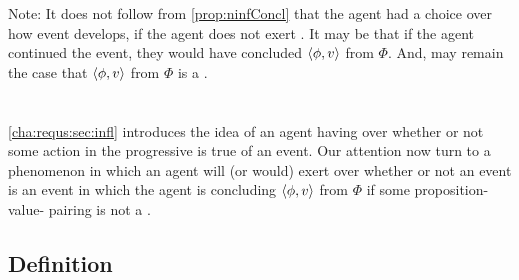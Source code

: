\begin{note}
  Note:
  It does not follow from \autoref{prop:ninfConcl} that the agent had a choice over how event develops, if the agent does not exert \ninf{}.
  It may be that if the agent continued the event, they would have concluded \(\langle \phi, v \rangle\) from \(\Phi\).
  And, may remain the case that \(\langle \phi, v \rangle\) from \(\Phi\) is a \fc{}.
\end{note}

\section{}
\label{cha:requs:sec:definition}

\begin{note}
  \autoref{cha:requs:sec:infl} introduces the idea of an agent having \ninf{} over whether or not some action in the progressive is true of an event.
  Our attention now turn to a phenomenon in which an agent will (or would) exert \ninf{} over whether or not an event is an event in which the agent is concluding \(\langle \phi, v \rangle\) from \(\Phi\) if some proposition-value-\poP{} pairing is not a \fc{}.
\end{note}


\subsection{Definition}
\label{cha:requs:sec:definition}

